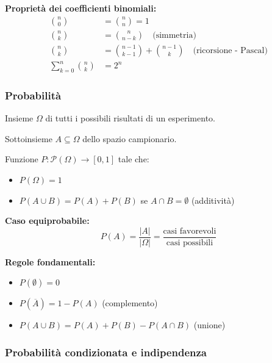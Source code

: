 \textbf{Proprietà dei coefficienti binomiali:}
\begin{align*}
	\binom{n}{0} &= \binom{n}{n} = 1 \\
	\binom{n}{k} &= \binom{n}{n-k} \quad \text{(simmetria)} \\
	\binom{n}{k} &= \binom{n-1}{k-1} + \binom{n-1}{k} \quad \text{(ricorsione - Pascal)} \\
	\sum_{k=0}^{n} \binom{n}{k} &= 2^n
\end{align*}

\subsubsection{Probabilità}

\begin{definizione}
	Insieme $\Omega$ di tutti i possibili risultati di un esperimento.
\end{definizione}

\begin{definizione}[Evento]
	Sottoinsieme $A \subseteq \Omega$ dello spazio campionario.
\end{definizione}

\begin{definizione}[Probabilità]
	Funzione $P: \mathcal{P}(\Omega) \to [0,1]$ tale che:
	\begin{itemize}
		\item $P(\Omega) = 1$
		\item $P(A \cup B) = P(A) + P(B)$ se $A \cap B = \emptyset$ (additività)
	\end{itemize}
	
	\textbf{Caso equiprobabile:}
	\[
	P(A) = \frac{|A|}{|\Omega|} = \frac{\text{casi favorevoli}}{\text{casi possibili}}
	\]
\end{definizione}

\textbf{Regole fondamentali:}
\begin{itemize}
	\item $P(\emptyset) = 0$
	\item $P(\overline{A}) = 1 - P(A)$ (complemento)
	\item $P(A \cup B) = P(A) + P(B) - P(A \cap B)$ (unione)
\end{itemize}

\subsubsection{Probabilità condizionata e indipendenza}

